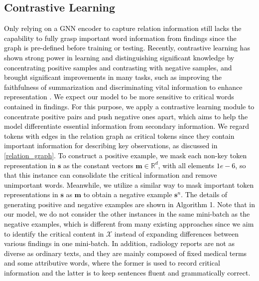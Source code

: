\documentclass[11pt]{article}
\begin{document}
\subsection{Contrastive Learning}
\textcolor{black}{
%
Only relying on a GNN encoder to capture relation information still lacks the capability to fully grasp important word information from findings since the graph is pre-defined before training or testing.
%
Recently, contrastive learning has shown strong power in learning and distinguishing significant knowledge by concentrating positive samples and contrasting with negative samples, and brought significant improvements in many tasks, such as improving the faithfulness of summarization and discriminating vital information to enhance representation \cite{cao2021cliff,zeng2021modeling}.
%
We expect our model to be more sensitive to critical words contained in findings.
%
For this purpose, we apply a contrastive learning module to concentrate positive pairs and push negative ones apart, which aims to help the model differentiate essential information from secondary information.
%
We regard tokens with edges in the relation graph as critical tokens since they contain important information for describing key observations, as discussed in \ref{relation_graph}.
%
To construct a positive example, we mask each non-key token representation in $\mathbf{s}$ as the constant vectors $\mathbf{m} \in \mathbb{R}^{d}$, with all elements $1e-6$, so that this instance can consolidate the critical information and remove unimportant words.
%
Meanwhile, we utilize a similar way to mask important token representations in $\mathbf{s}$ as $\mathbf{m}$ to obtain a negative example $\mathbf{s}^{n}$.
%
The details of generating positive and negative examples are shown in Algorithm 1.
%
Note that in our model, we do not consider the other instances in the same mini-batch as the negative examples, which is different from many existing approaches \cite{kim2021self,giorgi2020declutr} since we aim to identify the critical content in $\mathcal{X}$ instead of expanding differences between various findings in one mini-batch.
%
In addition, radiology reports are not as diverse as ordinary texts, and they are mainly composed of fixed medical terms and some attributive words, where the former is used to record critical information and the latter is to keep sentences fluent and grammatically correct.
}
\end{document}

